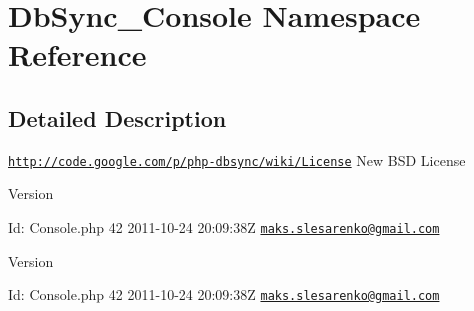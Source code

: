 \hypertarget{namespaceDbSync__Console}{
\section{DbSync\_\-Console Namespace Reference}
\label{namespaceDbSync__Console}
}


\subsection{Detailed Description}
\href{http://code.google.com/p/php-dbsync/wiki/License}{\tt http://code.google.com/p/php-\/dbsync/wiki/License} New BSD License \begin{DoxyVersion}{Version}

\end{DoxyVersion}
\begin{DoxyParagraph}{Id:}
Console.php 42 2011-\/10-\/24 20:09:38Z \href{mailto:maks.slesarenko@gmail.com}{\tt maks.slesarenko@gmail.com} 
\end{DoxyParagraph}


\begin{DoxyVersion}{Version}

\end{DoxyVersion}
\begin{DoxyParagraph}{Id:}
Console.php 42 2011-\/10-\/24 20:09:38Z \href{mailto:maks.slesarenko@gmail.com}{\tt maks.slesarenko@gmail.com} 
\end{DoxyParagraph}
